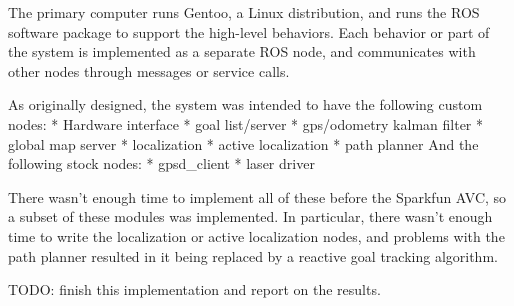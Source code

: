 
The primary computer runs Gentoo, a Linux distribution, and runs the ROS software package to support the high-level behaviors. Each behavior or part of the system is implemented as a separate ROS node, and communicates with other nodes through messages or service calls.

As originally designed, the system was intended to have the following custom nodes:
* Hardware interface
* goal list/server
* gps/odometry kalman filter
* global map server
* localization
* active localization
* path planner
And the following stock nodes:
* gpsd\_client
* laser driver

There wasn't enough time to implement all of these before the Sparkfun AVC, so a subset of these modules was implemented. In particular, there wasn't enough time to write the localization or active localization nodes, and problems with the path planner resulted in it being replaced by a reactive goal tracking algorithm.

TODO: finish this implementation and report on the results.
